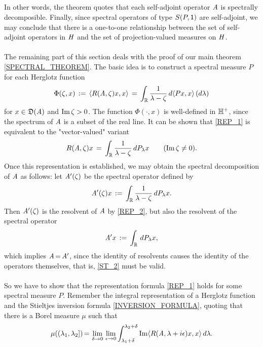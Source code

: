\documentclass[11pt,twoside]{article}
\begin{document}
\subparagraph{}
In other words,
the theorem quotes that each self-adjoint operator $\mathit{A}$
is spectrally decomposible.
Finally,
since spectral operators of type ${S}(P,{\mathsf{1}})$ are self-adjoint,
we may conclude that there is a one-to-one relationship between
the set of self-adjoint operators in $\mathit{H}$ and
the set of projection-valued measures on $\mathit{H}$.

\paragraph{}
The remaining part of this section deals with the proof
of our main theorem \ref{SPECTRAL_THEOREM}.
The basic idea is to construct a spectral measure $P$ for each Herglotz function
\begin{equation}\label{REP_1}
\Phi(\zeta,x)
\,:=\, \langle R(\mathit{A},\zeta)x,x \rangle
\,=\, \int_{{\mathbb{R}}} \frac{1}{\lambda-\zeta} \, d\langle Px,x \rangle\,(d\lambda)
\end{equation}
for $x \in \mathfrak{D}(\mathit{A})$ and $\operatorname{Im} \zeta > 0$.
The function $\Phi(\cdot,x)$ is well-defined in ${\mathbb{H}}^+$,
since the spectrum of $\mathit{A}$ is a subset of the real line.
It can be shown that \eqref{REP_1} is equivalent to the "vector-valued"
variant
\begin{equation}\label{REP_2}
R(\mathit{A},\zeta)x \,=\, \int_{{\mathbb{R}}} \frac{1}{\lambda-\zeta} \, dP_{\lambda}x
\quad \quad (\operatorname{Im} \zeta \neq 0).
\end{equation}
Once this representation is established,
we may obtain the spectral decomposition of $\mathit{A}$ as follows:
let $\mathit{A}'(\zeta)$ be the spectral operator defined by
\[
\mathit{A}'(\zeta) x \,:=\, \int_{{\mathbb{R}}} \frac{1}{\lambda-\zeta} \, dP_{\lambda}x.
\]
Then $\mathit{A}'(\zeta)$ is the resolvent of $\mathit{A}$ by \eqref{REP_2},
but also the resolvent of the spectral operator 
\[
\mathit{A}' x \,:=\, \int_{{\mathbb{R}}} \, dP_{\lambda}x,
\]
which implies $\mathit{A} {\,=\,} \mathit{A}'$, since the identity of resolvents causes
the identity of the operators themselves,
that is, \eqref{ST_2} must be valid.

\paragraph{}
So we have to show that the representation formula \eqref{REP_1}
holds for some spectral measure $P$.
Remember the integral representation of a Herglotz function
and the Stieltjes inversion formula \eqref{INVERSION_FORMULA},
quoting that there is a Borel measure $\mu$ such that
\begin{equation}\label{INVERSION_FORMULA_2}
\mu((\lambda_1,\lambda_2]) {\,=\,} \lim_{\delta \to 0} \, \lim_{\epsilon \to 0}
\int_{\lambda_1+\delta}^{\lambda_2+\delta}
\operatorname{Im} \langle R(\mathit{A},\lambda + i \epsilon)x,x \rangle \, d\lambda.
\end{equation}
\end{document}
